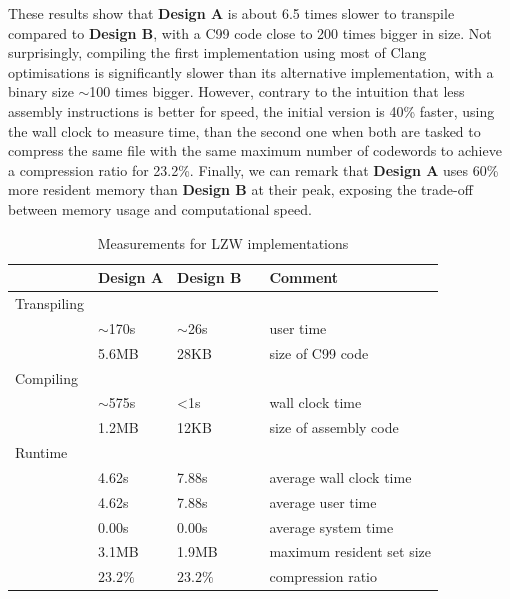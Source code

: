 \documentclass[a4paper,twoside]{article}
\begin{document}
These results show that \textbf{Design A} is about 6.5 times slower to transpile
compared to \textbf{Design B}, with a C99 code close to 200 times bigger in
size. Not surprisingly, compiling the first implementation using most of Clang
optimisations is significantly slower than its alternative implementation, with
a binary size $\sim$100 times bigger. However, contrary to the intuition that
less assembly instructions is better for speed, the initial version is 40\%
faster, using the wall clock to measure time, than the second one when both are
tasked to compress the same file with the same maximum number of codewords to
achieve a compression ratio for 23.2\%. Finally, we can remark that
\textbf{Design A} uses 60\% more resident memory than \textbf{Design B} at their
peak, exposing the trade-off between memory usage and computational speed.

\begin{table}[h]
\centering
\begin{tabular}{@{}lllll@{}}
\toprule
            & Design A   & Design B    &  & Comment                   \\ \midrule
Transpiling &            &             &  &                           \\
            & $\sim$170s & $\sim$26s   &  & user time                 \\
            & 5.6MB      & 28KB        &  & size of C99 code          \\ \midrule
Compiling   &            &             &  &                           \\
            & $\sim$575s & <1s         &  & wall clock time           \\
            & 1.2MB      & 12KB        &  & size of assembly code     \\ \midrule
Runtime     &            &             &  &                           \\
            & 4.62s      & 7.88s       &  & average wall clock time   \\
            & 4.62s      & 7.88s       &  & average user time         \\
            & 0.00s      & 0.00s       &  & average system time       \\
            & 3.1MB      & 1.9MB       &  & maximum resident set size \\
            & $23.2\%$   & $23.2\%$    &  & compression ratio         \\ \bottomrule
\end{tabular}
\caption{Measurements for LZW implementations}
\label{tab:LZW}
\end{table}
\end{document}
